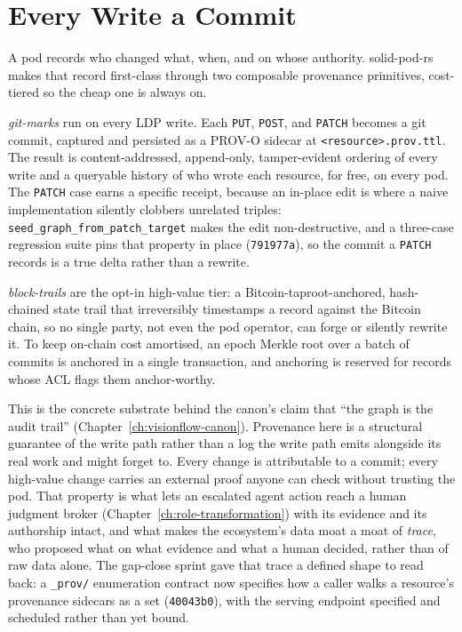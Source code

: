 \section{Every Write a Commit}

A pod records who changed what, when, and on whose authority. solid-pod-rs makes that record first-class through two composable provenance primitives, cost-tiered so the cheap one is always on.

\emph{git-marks} run on every LDP write. Each \texttt{PUT}, \texttt{POST}, and \texttt{PATCH} becomes a git commit, captured and persisted as a PROV-O sidecar at \texttt{<resource>.prov.ttl}. The result is content-addressed, append-only, tamper-evident ordering of every write and a queryable history of who wrote each resource, for free, on every pod. The \texttt{PATCH} case earns a specific receipt, because an in-place edit is where a naive implementation silently clobbers unrelated triples: \texttt{seed\_graph\_from\_patch\_target} makes the edit non-destructive, and a three-case regression suite pins that property in place (\texttt{791977a}), so the commit a \texttt{PATCH} records is a true delta rather than a rewrite.

\emph{block-trails} are the opt-in high-value tier: a Bitcoin-taproot-anchored, hash-chained state trail that irreversibly timestamps a record against the Bitcoin chain, so no single party, not even the pod operator, can forge or silently rewrite it. To keep on-chain cost amortised, an epoch Merkle root over a batch of commits is anchored in a single transaction, and anchoring is reserved for records whose ACL flags them anchor-worthy.

This is the concrete substrate behind the canon's claim that ``the graph is the audit trail'' (Chapter~\ref{ch:visionflow-canon}). Provenance here is a structural guarantee of the write path rather than a log the write path emits alongside its real work and might forget to. Every change is attributable to a commit; every high-value change carries an external proof anyone can check without trusting the pod. That property is what lets an escalated agent action reach a human judgment broker (Chapter~\ref{ch:role-transformation}) with its evidence and its authorship intact, and what makes the ecosystem's data moat a moat of \emph{trace}, who proposed what on what evidence and what a human decided, rather than of raw data alone. The gap-close sprint gave that trace a defined shape to read back: a \texttt{\_prov/} enumeration contract now specifies how a caller walks a resource's provenance sidecars as a set (\texttt{40043b0}), with the serving endpoint specified and scheduled rather than yet bound.

